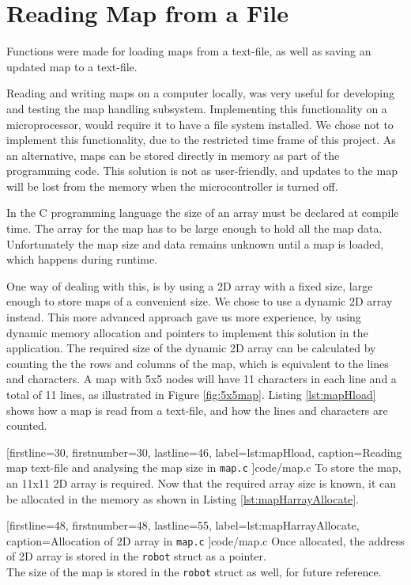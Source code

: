 \newpage
\section{Reading Map from a File}
\label{sec:map_read} %
Functions were made for loading maps from a text-file, as well as saving an updated map to a text-file. 

Reading and writing maps on a computer locally, was very useful for developing and testing the map handling subsystem. 
Implementing this functionality on a microprocessor, would require it to have a file system installed.
We chose not to implement this functionality, due to the restricted time frame of this project.
As an alternative, maps can be stored directly in memory as part of the programming code. 
This solution is not as user-friendly, and updates to the map will be lost from the memory when the microcontroller is turned off.

In the C programming language the size of an array must be declared at compile time. 
The array for the map has to be large enough to hold all the map data.
Unfortunately the map size and data remains unknown until a map is loaded, which happens during runtime.

One way of dealing with this, is by using a 2D array with a fixed size, large enough to store maps of a convenient size. 
We chose to use a dynamic 2D array instead. 
This more advanced approach gave us more experience, by using dynamic memory allocation and pointers to implement this solution in the application.
\newpage
The required size of the dynamic 2D array can be calculated by counting the the rows and columns of the map,
which is equivalent to the lines and characters.
A map with 5x5 nodes will have 11 characters in each line and a total of 11 lines,
as illustrated in Figure \ref{fig:5x5map}. Listing \ref{lst:mapHload} shows how a map is read from a text-file, and how the lines and characters are counted.


[firstline=30,			%
firstnumber=30,			%
lastline=46,			%
label=lst:mapHload,		%
caption={Reading map text-file and analysing the map size in {\tt map.c}}
]{code/map.c}
To store the map, an 11x11 2D array is required.
Now that the required array size is known, it can be allocated in the memory as shown in Listing \ref{lst:mapHarrayAllocate}.


[firstline=48,			%
firstnumber=48,		%
lastline=55,			%
label=lst:mapHarrayAllocate,	%
caption={Allocation of 2D array in {\tt map.c}}
]{code/map.c}
Once allocated, the address of 2D array is stored in the {\tt robot} struct as a pointer.\\
The size of the map is stored in the {\tt robot} struct as well, for future reference.


